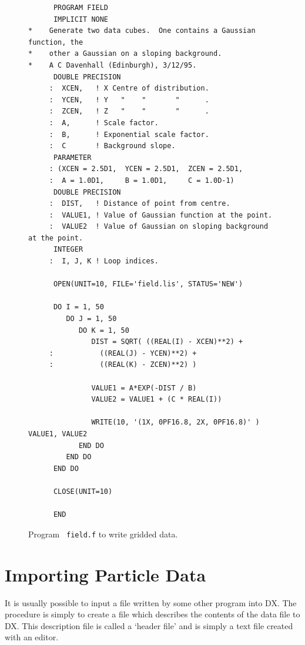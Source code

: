 \documentclass[twoside,11pt]{article}
\newcommand{\xlabel}[1]{}
\begin{document}
\begin{figure}[htbp]

\begin{verbatim}
      PROGRAM FIELD
      IMPLICIT NONE
*    Generate two data cubes.  One contains a Gaussian function, the
*    other a Gaussian on a sloping background.
*    A C Davenhall (Edinburgh), 3/12/95.
      DOUBLE PRECISION
     :  XCEN,   ! X Centre of distribution.
     :  YCEN,   ! Y   "    "       "      .
     :  ZCEN,   ! Z   "    "       "      .
     :  A,      ! Scale factor.
     :  B,      ! Exponential scale factor.
     :  C       ! Background slope.
      PARAMETER
     : (XCEN = 2.5D1,  YCEN = 2.5D1,  ZCEN = 2.5D1,
     :  A = 1.0D1,     B = 1.0D1,     C = 1.0D-1)
      DOUBLE PRECISION
     :  DIST,   ! Distance of point from centre.
     :  VALUE1, ! Value of Gaussian function at the point.
     :  VALUE2  ! Value of Gaussian on sloping background at the point.
      INTEGER
     :  I, J, K ! Loop indices.

      OPEN(UNIT=10, FILE='field.lis', STATUS='NEW')

      DO I = 1, 50
         DO J = 1, 50
            DO K = 1, 50
               DIST = SQRT( ((REAL(I) - XCEN)**2) +
     :           ((REAL(J) - YCEN)**2) +
     :           ((REAL(K) - ZCEN)**2) )

               VALUE1 = A*EXP(-DIST / B)
               VALUE2 = VALUE1 + (C * REAL(I))

               WRITE(10, '(1X, 0PF16.8, 2X, 0PF16.8)' ) VALUE1, VALUE2
            END DO
         END DO
      END DO

      CLOSE(UNIT=10)

      END
\end{verbatim}

\caption[Program {\tt field.f} to write gridded data.]{Program {\tt
field.f} to write gridded data. \label{FIELD.F} }

\end{figure}


\newpage
\section{\xlabel{IMP_PART}\label{IMP_PART}Importing Particle Data}


It is usually possible to input a file written by some other program
into DX. The procedure is simply to create a file which describes the
contents of the data file to DX. This description file is called a
`header file' and is simply a text file created with an editor.
\end{document}
